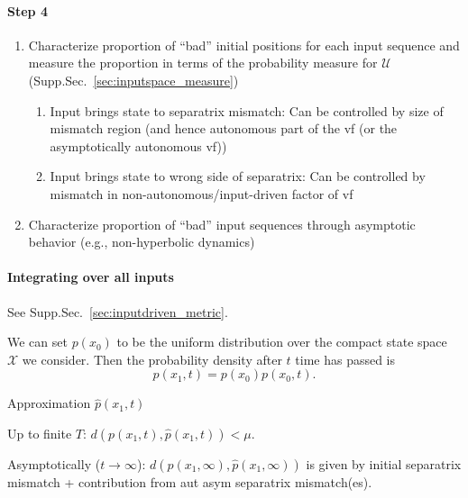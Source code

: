 \documentclass{article}
\theoremstyle{definition} \newtheorem{definition}{Definition}
\theoremstyle{remark} \newtheorem{remark}{Remark}
\newcounter{ct}
\begin{document}
\paragraph{Step 4}
\begin{enumerate}
\item Characterize proportion of “bad” initial positions for each input sequence and measure the proportion in terms of the probability measure for $\mathcal{U}$ (Supp.Sec.~\ref{sec:inputspace_measure})
\begin{enumerate}
\item Input brings state to separatrix mismatch: 
	Can be controlled by size of mismatch region (and hence autonomous part of the vf (or the asymptotically autonomous vf))
\item  Input brings state to wrong side of separatrix:
 	Can be controlled by mismatch in non-autonomous/input-driven factor of vf
\end{enumerate}
\item Characterize proportion of “bad” input sequences through asymptotic behavior (e.g., non-hyperbolic dynamics)
\end{enumerate}


\paragraph{Integrating over all inputs}
See Supp.Sec.~\ref{sec:inputdriven_metric}.

We can set $p(x_0)$ to be the uniform distribution over the compact state space $\mathcal{X}$ we consider. 
Then the probability density after $t$ time has passed is
\begin{equation}\label{eq:init_path_density}
p(x_1,t) = p(x_0)p(x_0,t).
\end{equation}


Approximation $\hat p(x_1,t)$

Up to finite $T$: $d(p(x_1,t),\hat p(x_1,t))<\mu$.

Asymptotically ($t\rightarrow\infty$): $d(p(x_1,\infty),\hat p(x_1,\infty))$ is given by initial separatrix mismatch + contribution from aut asym separatrix mismatch(es).


\end{document}
